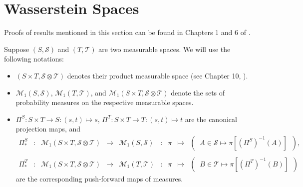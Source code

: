
\newcommand{\Wpo}{\mathcal{W}^{p}_{1}}


\section{Wasserstein Spaces}
\setcounter{theorem}{0}
\setcounter{equation}{0}

Proofs of results mentioned in this section can be found in Chapters 1 and 6 of \cite{Villani2009}.

\vskip 0.5cm
\noindent
Suppose $\left(S,\mathcal{S}\right)$ and $\left(T,\mathcal{T}\right)$ are two measurable spaces.
We will use the following notations:
\begin{itemize}
\item $\left(S \times T, \mathcal{S} \otimes \mathcal{T}\right)$ denotes their product measurable space (see Chapter 10, \cite{JacodProtter}).
\item $\mathcal{M}_{1}\!\left(S,\mathcal{S}\right)$, $\mathcal{M}_{1}\!\left(T,\mathcal{T}\right)$, and
	$\mathcal{M}_{1}\!\left(S \times T, \mathcal{S}\otimes\mathcal{T}\right)$
	denote the sets of probability measures on the respective measurable spaces.
\item $\Pi^{S} : S \times T \longrightarrow S : (s,t) \longmapsto s$,
	$\Pi^{T} : S \times T \longrightarrow T : (s,t) \longmapsto t$
	are the canonical projection maps, and
	\begin{equation*}
	\begin{array}{ccccccccc}
	\Pi^{S}_{*}
	&:
	&\mathcal{M}_{1}\!\left(S \times T, \mathcal{S}\otimes\mathcal{T}\right)
	&\longrightarrow
	&\mathcal{M}_{1}\!\left(S,\mathcal{S}\right)
	&:
	&\pi
	&\longmapsto
	&\left(\;\;A \in \mathcal{S} \longmapsto \pi\!\left[(\Pi^{S})^{-1}(A)\right]\;\;\right),
	\\ \\
	\Pi^{T}_{*}
	&:
	&\mathcal{M}_{1}\!\left(S \times T, \mathcal{S}\otimes\mathcal{T}\right)
	&\longrightarrow
	&\mathcal{M}_{1}\!\left(T,\mathcal{T}\right)
	&:
	&\pi
	&\longmapsto
	&\left(\;\;B \in \mathcal{T} \longmapsto \pi\!\left[(\Pi^{T})^{-1}(B)\right]\;\;\right)
	\end{array}
	\end{equation*}
	are the corresponding push-forward maps of measures.
\end{itemize}

